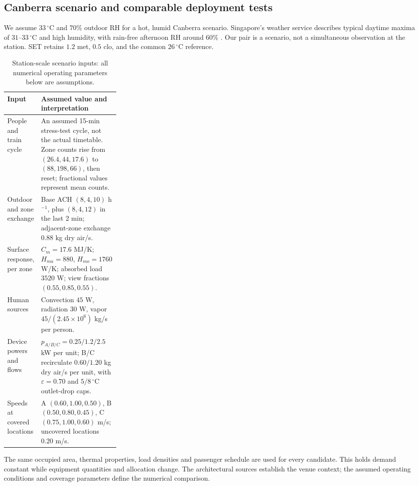 \subsection{Canberra scenario and comparable deployment tests}

We assume $33\,^{\circ}\mathrm C$ and $70\%$ outdoor RH for a hot, humid Canberra scenario. Singapore's weather service describes typical daytime maxima of $31$--$33\,^{\circ}\mathrm C$ and high humidity, with rain-free afternoon RH around $60\%$ \cite{singapore-climate}. Our pair is a scenario, not a simultaneous observation at the station. SET retains $1.2$ met, $0.5$ clo, and the common $26\,^{\circ}\mathrm C$ reference.

\begin{table}[!ht]
\centering\small
\caption{Station-scale scenario inputs: all numerical operating parameters below are assumptions.}
\label{tab:rail-inputs}
\begin{tabularx}{\linewidth}{@{}>{\raggedright\arraybackslash}p{0.27\linewidth}>{\raggedright\arraybackslash}X@{}}
\toprule
Input & Assumed value and interpretation\\
\midrule
People and train cycle & An assumed 15-min stress-test cycle, not the actual timetable. Zone counts rise from $(26.4,44,17.6)$ to $(88,198,66)$, then reset; fractional values represent mean counts.\\
Outdoor and zone exchange & Base ACH $(8,4,10)$ h$^{-1}$, plus $(8,4,12)$ in the last 2 min; adjacent-zone exchange $0.88$ kg dry air/s.\\
Surface response, per zone & $C_m=17.6$ MJ/K; $H_{ma}=880$, $H_{mo}=1760$ W/K; absorbed load $3520$ W; view fractions $(0.55,0.85,0.55)$.\\
Human sources & Convection $45$ W, radiation $30$ W, vapor $45/(2.45\times10^6)$ kg/s per person.\\
Device powers and flows & $p_{A/B/C}=0.25/1.2/2.5$ kW per unit; B/C recirculate $0.60/1.20$ kg dry air/s per unit, with $\varepsilon=0.70$ and $5/8\,^{\circ}\mathrm C$ outlet-drop caps.\\
Speeds at covered locations & A $(0.60,1.00,0.50)$, B $(0.50,0.80,0.45)$, C $(0.75,1.00,0.60)$ m/s; uncovered locations $0.20$ m/s.\\
\bottomrule
\end{tabularx}
\end{table}

The same occupied area, thermal properties, load densities and passenger schedule are used for every candidate. This holds demand constant while equipment quantities and allocation change. The architectural sources establish the venue context; the assumed operating conditions and coverage parameters define the numerical comparison.

